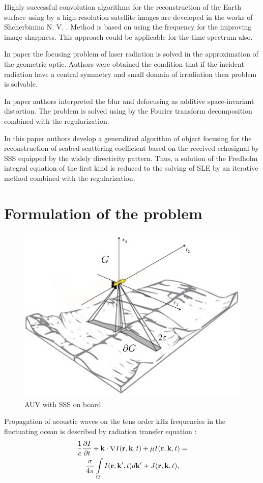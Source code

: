 \documentclass{procDDs}
\begin{document}
Highly successful convolution algorithms for the reconstruction of  the Earth surface  using by a high-resolution satellite images are developed in the works of Shcherbinina N. V. \cite{Shcherbinina}. Method is based on using the frequency for the improving image sharpness. This approach could be applicable for the time spectrum also.

In paper \cite{p2} the focusing problem of laser radiation is solved in the approximation of the geometric optic. Authors were obtained the condition that if the incident radiation have a central symmetry and small domain of irradiation then problem is solvable.

In paper \cite{p3} authors interpreted the blur and defocusing as additive space-invariant distortion. The problem is solved using by the Fourier transform decomposition combined with the regularization.

In this paper authors develop a generalized algorithm of object focusing for the reconstruction of seabed scattering coefficient based on the received echosignal by SSS equipped by the widely directivity pattern. Thus, a solution of the Fredholm integral equation of the first kind is reduced to the solving of SLE by an iterative method combined with the regularization.

\section{Formulation of the problem}
\begin{figure}[h!]\center
	
	\includegraphics[width=1\linewidth]{img/gbo.jpg}
	\caption{AUV with SSS on board}
	\label{ris:gbo}
\end{figure}
Propagation of acoustic waves on the tens order kHz frequencies in the fluctuating ocean is described by radiation
transfer equation \cite{AF2015, SPIE_KOV,SMJ2015}:
\begin{multline}
	\label{model}
	\frac{1}{c} \frac{\partial I}{\partial t} + \mathbf{k} \cdot \nabla I(\mathbf{r},\mathbf{k},t) + \mu I(\mathbf{r},\mathbf{k},t) = \\
	\frac{\sigma}{4 \pi} \int\limits_{\Omega} I(\mathbf{r},\mathbf{k}',t) d\mathbf{k}' + J(\mathbf{r},\mathbf{k},t),
\end{multline}
\end{document}
